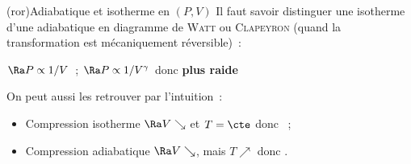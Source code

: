 \documentclass[../../main/main.tex]{subfiles}
\begin{document}
\begin{tcb*}[list
	entry={\hspace*{-20pt}\protect\rcheck~
	Adia.\ vs.\ isoT.\ en $(P,V)$}]
	(ror){Adiabatique et isotherme en $(P,V)$}
	Il faut savoir distinguer une isotherme d'une adiabatique en diagramme
	de \textsc{Watt} ou \textsc{Clapeyron} (quand la transformation est
	mécaniquement réversible)~:
	\noindent
	\begin{minipage}[c]{.65\linewidth}
		\begin{itemize}
			 $\Ra P \propto 1/V$~;
			 $\Ra P \propto 1/V^{\gamma}$ donc \textbf{plus raide}
		\end{itemize}
		On peut aussi les retrouver par l'intuition~:
		\begin{itemize}
			\item Compression isotherme $\Ra V \searrow$ et $T=\cte$ donc \xul{\psw{$P
						      \nearrow$}}~;
			\item Compression adiabatique $\Ra V \searrow$, mais $T \nearrow$ donc
			      \xul{\psw{$P \nearrow\nearrow$}}.
		\end{itemize}
	\end{minipage}
	\hfill
	\begin{minipage}[c]{.33\linewidth}
		\begin{center}
\end{center}
\end{minipage}
\end{tcb*}
\end{document}
